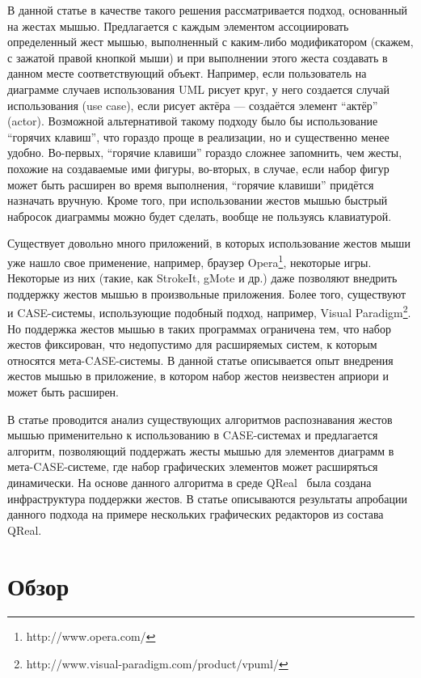 \documentclass[a5paper]{article}
\begin{document}
В данной статье в качестве такого решения рассматривается подход, основанный на жестах мышью. Предлагается с каждым элементом ассоциировать определенный жест мышью, выполненный с каким-либо модификатором (скажем, с зажатой правой кнопкой мыши) и при выполнении этого жеста создавать в данном месте соответствующий объект. Например, если пользователь на диаграмме случаев использования UML рисует круг, у него создается случай использования (use case), если рисует актёра --- создаётся элемент ``актёр'' (actor). Возможной альтернативой такому подходу было бы использование ``горячих клавиш'', что гораздо проще в реализации, но и существенно менее удобно. Во-первых, ``горячие клавиши'' гораздо сложнее запомнить, чем жесты, похожие на создаваемые ими фигуры, во-вторых, в случае, если набор фигур может быть расширен во время выполнения, ``горячие клавиши'' придётся назначать вручную. Кроме того, при использовании жестов мышью быстрый набросок диаграммы можно будет сделать, вообще не пользуясь клавиатурой.

Существует довольно много приложений, в которых использование жестов мыши уже нашло свое применение, например, браузер Opera\footnote{http://www.opera.com/}, некоторые игры. Некоторые из них (такие, как StrokeIt, gMote и др.) даже позволяют внедрить поддержку  жестов мышью в произвольные приложения. Более того, существуют и CASE-системы, использующие подобный подход, например, Visual Paradigm\footnote{http://www.visual-paradigm.com/product/vpuml/}. Но поддержка жестов мышью в таких программах ограничена тем, что набор жестов фиксирован, что недопустимо для расширяемых систем, к которым относятся мета-CASE-системы. В данной статье описывается опыт внедрения жестов мышью в приложение, в котором набор жестов неизвестен априори и может быть расширен.

В статье проводится анализ существующих алгоритмов распознавания жестов мышью применительно к использованию в CASE-системах и предлагается алгоритм, позволяющий поддержать жесты мышью для элементов диаграмм в мета-CASE-системе, где набор графических элементов может расширяться динамически. На основе данного алгоритма в среде QReal~\cite{qreal} была создана инфраструктура поддержки жестов. В статье описываются результаты апробации данного подхода на примере нескольких графических редакторов из состава QReal. 

\section{Обзор}
\end{document}
